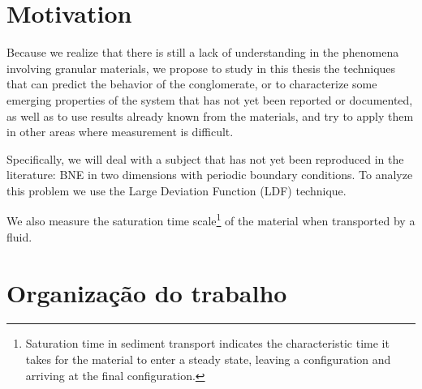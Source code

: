 \section{Motivation}
\label{sec:motivacao}

    
    Because we realize that there is still a lack of understanding in the phenomena involving granular materials, we propose to study in this thesis the techniques that can predict the behavior of the conglomerate, or to characterize some emerging properties of the system that has not yet been reported or documented, as well as to use results already known from the materials, and try to apply them in other areas where measurement is difficult.


    Specifically, we will deal with a subject that has not yet been reproduced in the literature: BNE in two dimensions with periodic boundary conditions. To analyze this problem we use the Large Deviation Function (LDF) \cite{Large_Deviation_in_Physics} technique.


    We also measure the saturation time scale\footnote{Saturation time in sediment transport indicates the characteristic time it takes for the material to enter a steady state, leaving a configuration and arriving at the final configuration.} of the material when transported by a fluid.

\section{Organização do trabalho}
\label{sec:organizacaoTrabalho}

